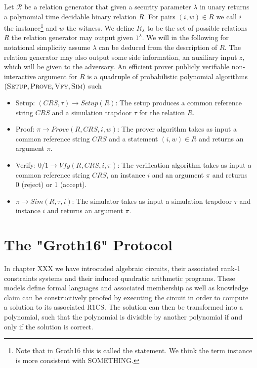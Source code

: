 \begin{definition} 
Let $\mathcal{R}$ be a relation generator that given a security parameter $\lambda$ in unary returns a polynomial time decidable binary relation $R$. For pairs $(i,w)\in R$ we call $i$ the instance\footnote{Note that in Groth16 this is called the statement. We think the term instance is more consistent with SOMETHING. } and $w$ the witness. We define $R_\lambda$ to be the set of possible relations $R$ the relation generator may output given $1^\lambda$. We will in the following for notational simplicity assume $\lambda$ can be deduced from the description of $R$. The relation generator may also output some side information, an auxiliary input $z$, which will be given to the adversary. An efficient prover publicly verifiable non-interactive argument for $R$ is a quadruple of probabilistic polynomial algorithms $(\textsc{Setup},\textsc{Prove},\textsc{Vfy},\textsc{Sim})$ such 
\begin{itemize}
\item Setup: $(CRS,\tau)\rightarrow Setup(R)$: The setup produces a common reference string $CRS$ and a simulation trapdoor $\tau$ for the relation $R$.
\item Proof: $\pi\rightarrow Prove(R,CRS,i,w)$: The prover algorithm takes as input a common reference string $CRS$ and a statement $(i,w)\in R$ and returns an argument $\pi$.
\item Verify: $0/1\rightarrow Vfy(R,CRS,i,\pi)$: The  verification algorithm  takes as input a common reference string $CRS$, an instance $i$ and an argument $\pi$ and returns 0 (reject) or 1 (accept).
\item $\pi\rightarrow Sim(R,\tau,i)$: The simulator takes as input a simulation trapdoor $\tau$ and instance $i$ and returns an argument $\pi$. 
\end{itemize}
\end{definition}


\section{The "Groth16" Protocol} In chapter XXX we have introcuded algebraic circuits, their associated rank-1 constraints systems and their induced quadratic arithmetic programs. These models define formal languages and associated membership as well as knowledge claim can be constructively proofed by executing the circuit in order to compute a solution to its associated R1CS. The solution can then be transformed into a polynomial, such that the polynomial is divisible by another polynomial if and only if the solution is correct. 
 
